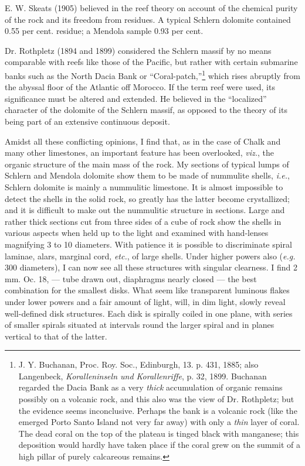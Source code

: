 \documentclass[a4paper, 12pt, oneside, landscape]{article}
\begin{document}
E. W. Skeats (1905) believed in the reef theory on account of the chemical purity of the rock and its freedom from residues. A typical Schlern dolomite contained 0.55 per cent. residue; a Mendola sample 0.93 per cent.

Dr. Rothpletz (1894 and 1899) considered the Schlern massif by no means comparable with reefs like those of the Pacific, but rather with certain submarine banks such as the North Dacia Bank or ``Coral-patch,''\footnote{J. Y. Buchanan, Proc. Roy. Soc., Edinburgh, 13. p. 431, 1885; also Langenbeck, \emph{Koralleninseln und Korallenriffe}, p. 32, 1899. Buchanan regarded the Dacia Bank as a very \emph{thick} accumulation of organic remains possibly on a volcanic rock, and this also was the view of Dr. Rothpletz; but the evidence seems inconclusive. Perhaps the bank is a volcanic rock (like the emerged Porto Santo Island not very far away) with only a \emph{thin} layer of coral. The dead coral on the top of the plateau is tinged black with manganese; this deposition would hardly have taken place if the coral grew on the summit of a high pillar of purely calcareous remains.} which rises abruptly from the abyssal floor of the Atlantic off Morocco. If the term reef were used, its significance must be altered and extended. He believed in the ``localized'' character of the dolomite of the Schlern massif, as opposed to the theory of its being part of an extensive continuous deposit.

Amidst all these conflicting opinions, I find that, as in the case of Chalk and many other limestones, an important feature has been overlooked, \emph{viz.}, the organic structure of the main mass of the rock. My sections of typical lumps of Schlern and Mendola dolomite show them to be made of nummulite shells, \emph{i.e.}, Schlern dolomite is mainly a nummulitic limestone. It is almost impossible to detect the shells in the solid rock, so greatly has the latter become crystallized; and it is difficult to make out the nummulitic structure in sections. Large and rather thick sections cut from three sides of a cube of rock show the shells in various aspects when held up to the light and examined with hand-lenses magnifying 3 to 10 diameters. With patience it is possible to discriminate spiral laminae, alars, marginal cord, \emph{etc.}, of large shells. Under higher powers also (\emph{e.g.} 300 diameters), I can now see all these structures with singular clearness. I find 2 mm. Oc. 18, --- tube drawn out, diaphragms nearly closed --- the best combination for the smallest disks. What seem like transparent luminous flakes under lower powers and a fair amount of light, will, in dim light, slowly reveal well-defined disk structures. Each disk is spirally coiled in one plane, with series of smaller spirals situated at intervals round the larger spiral and in planes vertical to that of the latter.
\end{document}
